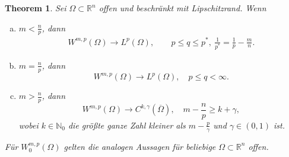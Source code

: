 \documentclass[
paper=a4,
bibtotocnumbered,
liststotocnumbered,
tablecaptionabove,
pointlessnumbers,
twoside,
openright,
10pt
]
{report}
\newtheorem{thm}{Theorem}[chapter]
\theoremstyle{definition}
\numberwithin{equation}{chapter}
\begin{document}
\begin{thm}
Sei $\Omega \subset \mathbb R^n$ offen und beschränkt mit Lipschitzrand. Wenn
\begin{enumerate}[a)]
\item $m<\frac{n}{p}$, dann
\begin{align*}
W^{m,p}(\Omega) \to L^p(\Omega),&\ \quad p\le q \le p^*, \ \frac{1}{p^*} = \frac{1}{p} - \frac{m}{n}.
\end{align*}
\item $m= \frac{n}{p}$, dann
\begin{equation}
W^{m,p}(\Omega) \to L^p(\Omega), \quad p \le q <\infty.
\end{equation}
\item $m>\frac{n}{p}$, dann
\begin{equation}
W^{m,p}(\Omega) \to C^{k,\gamma}(\overline{\Omega}), \quad m- \frac{n}{p} \ge k + \gamma,
\end{equation}
wobei $k \in \mathbb N_0$ die größte ganze Zahl kleiner als $m- \frac{p}{\gamma}$ und $\gamma \in (0,1)$ ist.
\end{enumerate} 
Für $W_0^{m,p}(\Omega)$ gelten die analogen Aussagen für beliebige $\Omega \subset \mathbb R^n$ offen.
\end{thm}
\end{document}
